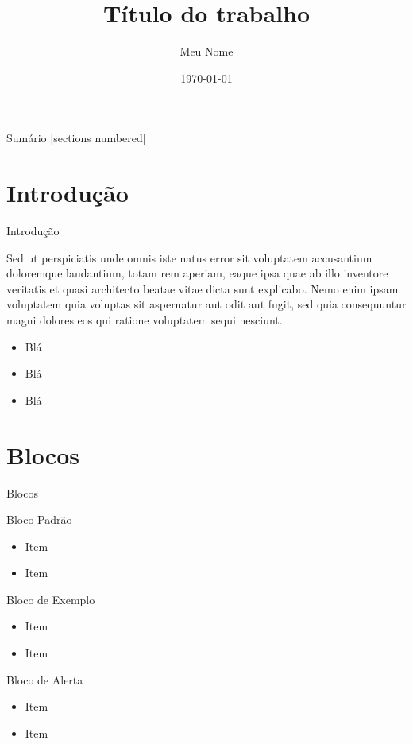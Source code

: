 \documentclass{beamer}
\title{Título do trabalho}
\date{\today}
\author{Meu Nome}
\institute{Universidade Federal do Pampa}
\begin{document}
	
	\begin{frame}[noframenumbering]
		\titlepage
		\thispagestyle{empty}
	\end{frame}
	
	\begin{frame}{Sumário}
		[sections numbered]
		\tableofcontents[hideallsubsections]
	\end{frame}

\section{Introdução}
\begin{frame}{Introdução}
	
	Sed ut perspiciatis unde omnis iste natus error sit voluptatem accusantium doloremque laudantium, totam rem aperiam, eaque ipsa quae ab illo inventore veritatis et quasi architecto beatae vitae dicta sunt explicabo. Nemo enim ipsam voluptatem quia voluptas sit aspernatur aut odit aut fugit, sed quia consequuntur magni dolores eos qui ratione voluptatem sequi nesciunt. 
	
	\begin{itemize}
		\item Blá
		\item Blá
		\item Blá
	\end{itemize}

\end{frame}


\section{Blocos}

\begin{frame}{Blocos}

	\begin{block}{Bloco Padrão}
		\begin{itemize}
			\item Item
			\item Item
		\end{itemize}
	\end{block}
	
	
	\begin{exampleblock}{Bloco de Exemplo}
		\begin{itemize}
			\item Item
			\item Item
		\end{itemize}
	\end{exampleblock}
	
	\begin{alertblock}{Bloco de Alerta}
		\begin{itemize}
			\item Item
			\item Item
		\end{itemize}
	\end{alertblock}

\end{frame}
\end{document}
